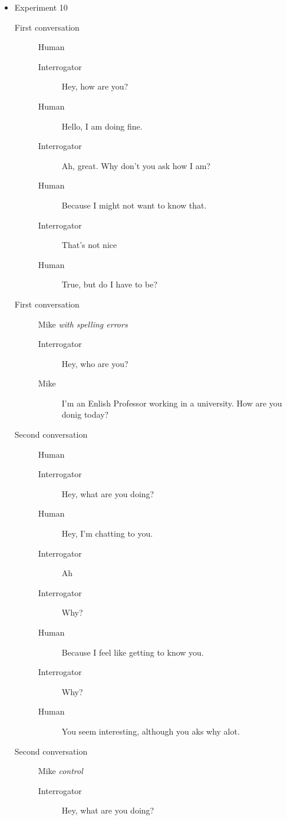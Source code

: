 \begin{itemize}
   \item Experiment 10
      \begin{description}
         \item [First conversation] Human
            \begin{description}
               \item [Interrogator] Hey, how are you?
               \item [Human] Hello, I am doing fine.
               \item [Interrogator] Ah, great. Why don't you ask how I am?
               \item [Human] Because I might not want to know that.
               \item [Interrogator] That's not nice
               \item [Human] True, but do I have to be?
            \end{description}
         \item [First conversation] Mike \textit{with spelling errors}
            \begin{description}
               \item [Interrogator] Hey, who are you?
               \item [Mike] I'm an Enlish Professor working in a university. How are you donig today?
            \end{description}
         \item [Second conversation] Human
            \begin{description}
               \item [Interrogator] Hey, what are you doing?
               \item [Human] Hey, I'm chatting to you.
               \item [Interrogator] Ah
               \item [Interrogator] Why?
               \item [Human] Because I feel like getting to know you.
               \item [Interrogator] Why?
               \item [Human] You seem interesting, although you aks why alot.
            \end{description}
         \item [Second conversation] Mike \textit{control}
            \begin{description}
               \item [Interrogator] Hey, what are you  doing?

\end{description}
\end{description}
\end{itemize}
